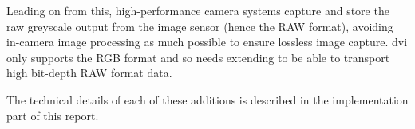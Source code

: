 Leading on from this, high-performance camera systems capture and store the raw greyscale output from the image sensor (hence the RAW format), avoiding in-camera image processing as much possible to ensure lossless image capture. \gls{dvi} only supports the RGB format and so needs extending to be able to transport high bit-depth RAW format data.

The technical details of each of these additions is described in the implementation part of this report. 

